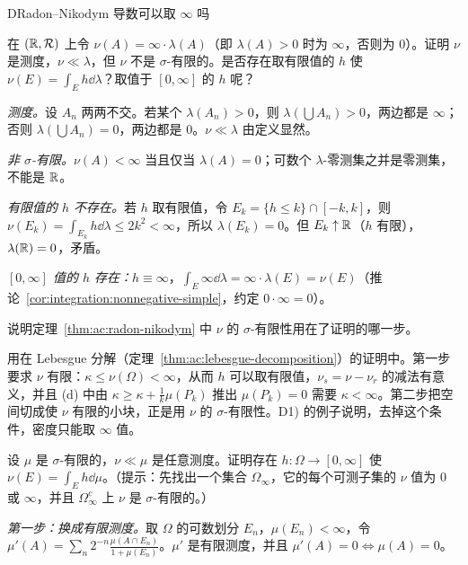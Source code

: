 \begin{probleme}[问题]{D}{Radon--Nikodym 导数可以取 \texorpdfstring{$\infty$}{∞} 吗}
\begin{questions}
\item 在 $(\mathbb{R},\mathcal{R})$ 上令 $\nu(A)=\infty\cdot\lambda(A)$（即 $\lambda(A)>0$ 时为 $\infty$，否则为 $0$）。证明 $\nu$ 是测度，$\nu\ll\lambda$，但 $\nu$ 不是 $\sigma$-有限的。是否存在取有限值的 $h$ 使 $\nu(E)=\int_Eh\dd\lambda$？取值于 $[0,\infty]$ 的 $h$ 呢？
\begin{solution}
\emph{测度。}设 $A_n$ 两两不交。若某个 $\lambda(A_n)>0$，则 $\lambda(\bigcup A_n)>0$，两边都是 $\infty$；否则 $\lambda(\bigcup A_n)=0$，两边都是 $0$。$\nu\ll\lambda$ 由定义显然。

\emph{非 $\sigma$-有限。}$\nu(A)<\infty$ 当且仅当 $\lambda(A)=0$；可数个 $\lambda$-零测集之并是零测集，不能是 $\mathbb{R}$。

\emph{有限值的 $h$ 不存在。}若 $h$ 取有限值，令 $E_k=\{h\leqslant k\}\cap[-k,k]$，则 $\nu(E_k)=\int_{E_k}h\dd\lambda\leqslant2k^2<\infty$，所以 $\lambda(E_k)=0$。但 $E_k\uparrow\mathbb{R}$（$h$ 有限），$\lambda(\mathbb{R})=0$，矛盾。

\emph{$[0,\infty]$ 值的 $h$ 存在：}$h\equiv\infty$，$\int_E\infty\dd\lambda=\infty\cdot\lambda(E)=\nu(E)$（推论~\ref{cor:integration:nonnegative-simple}，约定 $0\cdot\infty=0$）。
\end{solution}
\item 说明定理~\ref{thm:ac:radon-nikodym} 中 $\nu$ 的 $\sigma$-有限性用在了证明的哪一步。
\begin{solution}
用在 Lebesgue 分解（定理~\ref{thm:ac:lebesgue-decomposition}）的证明中。第一步要求 $\nu$ 有限：$\kappa\leqslant\nu(\Omega)<\infty$，从而 $h$ 可以取有限值，$\nu_s=\nu-\nu_r$ 的减法有意义，并且 (d) 中由 $\kappa\geqslant\kappa+\frac1k\mu(P_k)$ 推出 $\mu(P_k)=0$ 需要 $\kappa<\infty$。第二步把空间切成使 $\nu$ 有限的小块，正是用 $\nu$ 的 $\sigma$-有限性。D1) 的例子说明，去掉这个条件，密度只能取 $\infty$ 值。
\end{solution}
\item 设 $\mu$ 是 $\sigma$-有限的，$\nu\ll\mu$ 是任意测度。证明存在 $h:\Omega\to[0,\infty]$ 使 $\nu(E)=\int_Eh\dd\mu$。（提示：先找出一个集合 $\Omega_\infty$，它的每个可测子集的 $\nu$ 值为 $0$ 或 $\infty$，并且 $\Omega_\infty^c$ 上 $\nu$ 是 $\sigma$-有限的。）
\begin{solution}
\emph{第一步：换成有限测度。}取 $\Omega$ 的可数划分 $E_n$，$\mu(E_n)<\infty$，令 $\mu'(A)=\sum_n2^{-n}\frac{\mu(A\cap E_n)}{1+\mu(E_n)}$。$\mu'$ 是有限测度，并且 $\mu'(A)=0\iff\mu(A)=0$。


\end{solution}
\end{questions}
\end{probleme}
